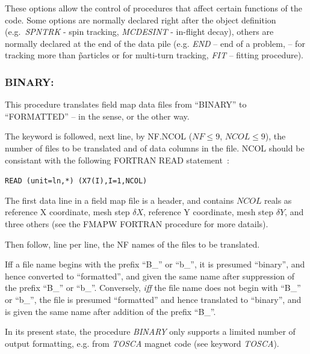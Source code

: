 These options allow the control of procedures that affect certain 
functions of the code. Some options are normally declared right after 
the object definition (e.g.~\textsl{SPNTRK} - spin tracking, 
\textsl{MCDESINT} -
in-flight decay),  others are normally declared at the end of the data pile (e.g. 
\textsl{END} -- end of a problem, 
\REBELOTE{} -- for tracking more than \imax\~particles  or for 
multi-turn tracking, 
\textsl{FIT} -- fitting procedure). 

\newpage

\subsubsection*{BINARY: \BINARYTitl}  \label{BINARY} 
\medskip

This procedure translates field map data files from ``BINARY'' to 
``FORMATTED'' -- in the \FORTRAN sense, or the other way.
\bigskip

\noindent The keyword is followed, next line, by NF.NCOL ($NF\leq9$, $NCOL\leq9$), the number of files to be translated and 
of data columns in the file.  NCOL should be consistant with the following FORTRAN READ statement~: 

       {\tt     READ (unit=ln,*) (X7(I),I=1,NCOL)}

\noindent The first data line in a field map file is a header, 
and contains $NCOL$ reals as reference X coordinate, mesh step $\delta X$, 
reference Y coordinate, mesh step $\delta Y$, and three others (see the FMAPW FORTRAN procedure for 
more datails).
 
\noindent Then follow, line per line, the NF names of the files to be translated.
\medskip

\noindent Iff a file name begins with the prefix ``B\_'' or ``b\_'', it is 
presumed ``binary'', and hence converted to ``formatted'', and given 
the same name after suppression of the prefix ``B\_'' or ``b\_''. Conversely, 
{\it iff} the file name does not begin with ``B\_'' or ``b\_'', the file is 
presumed ``formatted'' and hence translated to ``binary'', and is 
given the same name after addition of the prefix ``B\_''.
\medskip

\noindent In its present state, the procedure \textsl{BINARY} 
only supports a limited number of output formatting, e.g. from  \textsl{TOSCA} magnet code 
 (see keyword \textsl{TOSCA}). 


\newpage

